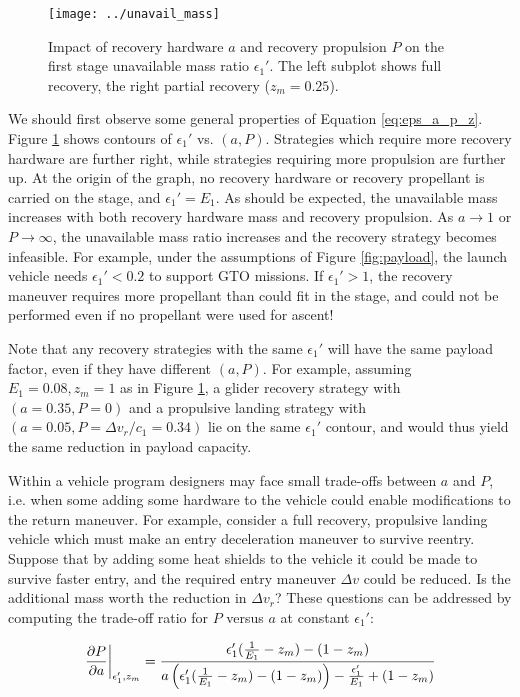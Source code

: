 \documentclass[conf]{new-aiaa}
\begin{document}
\begin{figure}[hbt!]
	\centering
	\texttt{[image: ../unavail\_mass]}
	\caption{\label{fig:unavail_mass} Impact of recovery hardware $a$ and recovery propulsion $P$ on the first stage unavailable mass ratio $\epsilon_1'$. The left subplot shows full recovery, the right partial recovery ($z_m=0.25$).}
\end{figure}

We should first observe some general properties of Equation \ref{eq:eps_a_p_z}. Figure \ref{fig:unavail_mass} shows contours of $\epsilon_1'$ vs. $(a, P)$. Strategies which require more recovery hardware are further right, while strategies requiring more propulsion are further up. At the origin of the graph, no recovery hardware or recovery propellant is carried on the stage, and $\epsilon_1' = E_1$. As should be expected, the unavailable mass increases with both recovery hardware mass and recovery propulsion. As $a \rightarrow 1$ or $P \rightarrow \infty$, the unavailable mass ratio increases and the recovery strategy becomes infeasible. For example, under the assumptions of Figure \ref{fig:payload}, the launch vehicle needs $\epsilon_1' < 0.2$ to support GTO missions. If $\epsilon_1' > 1$, the recovery maneuver requires more propellant than could fit in the stage, and could not be performed even if no propellant were used for ascent!

Note that any recovery strategies with the same $\epsilon_1'$ will have the same payload factor, even if they have different $(a, P)$. For example, assuming $E_1=0.08, z_m=1$ as in Figure \ref{fig:unavail_mass}, a glider recovery strategy with $(a=0.35, P=0)$ and a propulsive landing strategy with $(a=0.05, P = \Delta v_r/c_1 = 0.34)$ lie on the same $\epsilon_1'$ contour, and would thus yield the same reduction in payload capacity.

Within a vehicle program designers may face small trade-offs between $a$ and $P$, i.e. when some adding some hardware to the vehicle could enable modifications to the return maneuver. For example, consider a full recovery, propulsive landing vehicle which must make an entry deceleration maneuver to survive reentry. Suppose that by adding some heat shields to the vehicle it could be made to survive faster entry, and the required entry maneuver $\Delta v$ could be reduced. Is the additional mass worth the reduction in $\Delta v_r$? These questions can be addressed by computing the trade-off ratio for $P$ versus $a$ at constant $\epsilon_1'$:

\begin{equation}
\label{eq:tradeoff_ratio}
\left. \pdv{P}{a} \right|_{\epsilon_1', z_m} = \frac{\epsilon_1' (\frac{1}{E_1} - z_m) - (1 - z_m)}{a \left( \epsilon_1' (\frac{1}{E_1} - z_m) - (1 - z_m) \right) - \frac{\epsilon_1'}{E_1} + (1 - z_m)}
\end{equation}
\end{document}
